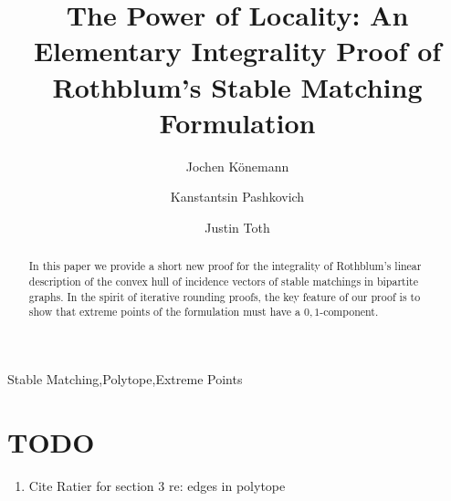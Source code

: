 \documentclass[3p,times]{elsarticle}
\begin{document}
\begin{frontmatter}



\title{The Power of Locality: An Elementary Integrality
  Proof of Rothblum's Stable Matching Formulation}
\author[co]{Jochen K\"{o}nemann}
\author[co]{Kanstantsin Pashkovich}
\author[co]{Justin Toth}
\address[co]{Department of Combinatorics and Optimization, University of Waterloo, Canada}


\begin{abstract}
  In this paper we provide a short new proof for the integrality of
  Rothblum's linear description of the convex hull of incidence
  vectors of stable matchings in bipartite graphs. In the spirit of
  iterative rounding proofs, the key feature of our proof is to show
  that extreme points of the formulation must have a $0,1$-component. 
\end{abstract}
\begin{keyword}
Stable Matching\sep Polytope\sep Extreme Points
\end{keyword}
\end{frontmatter}
{\color{red}
\section*{TODO}
\begin{enumerate}
	\item Cite Ratier for section 3 re: edges in polytope
\end{enumerate}
}
\end{document}
